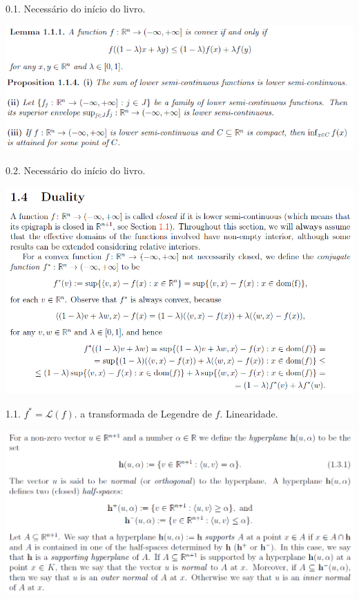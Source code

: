 \documentclass[12pt]{article}
\begin{document}
0.1. Necess\'ario do in\'icio do livro.

\vspace{300mm}

\vspace{3mm}

		\begin{center}
		\includegraphics[scale=1.7]{1b}
		\end{center}

0.2. Necess\'ario do in\'icio do livro.

\vspace{300mm}

\vspace{3mm}

		\begin{center}
		\includegraphics[scale=1.1]{1c}
		\end{center}

1.1. $f^* = \mathcal{L}(f)$. a transformada de Legendre de $f$. Linearidade.

\vspace{300mm}

		\begin{center}
		\includegraphics{2a}
		\end{center}
\end{document}
